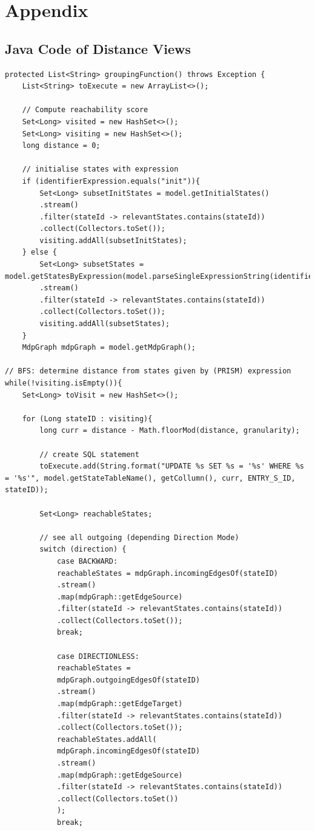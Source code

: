 \documentclass[preview]{standalone}
\begin{document}
\section{Appendix}
\subsection[]{Java Code of Distance Views}



\begin{lstlisting}[style=javaStyle, caption={grp Function java}]
protected List<String> groupingFunction() throws Exception {
	List<String> toExecute = new ArrayList<>();
	
	// Compute reachability score
	Set<Long> visited = new HashSet<>();
	Set<Long> visiting = new HashSet<>();
	long distance = 0;
	
	// initialise states with expression
	if (identifierExpression.equals("init")){
		Set<Long> subsetInitStates = model.getInitialStates()
		.stream()
		.filter(stateId -> relevantStates.contains(stateId))
		.collect(Collectors.toSet());
		visiting.addAll(subsetInitStates);
	} else {
		Set<Long> subsetStates = model.getStatesByExpression(model.parseSingleExpressionString(identifierExpression).toString())
		.stream()
		.filter(stateId -> relevantStates.contains(stateId))
		.collect(Collectors.toSet());
		visiting.addAll(subsetStates);
	}
	MdpGraph mdpGraph = model.getMdpGraph();

// BFS: determine distance from states given by (PRISM) expression
while(!visiting.isEmpty()){
	Set<Long> toVisit = new HashSet<>();
	
	for (Long stateID : visiting){
		long curr = distance - Math.floorMod(distance, granularity);
		
		// create SQL statement
		toExecute.add(String.format("UPDATE %s SET %s = '%s' WHERE %s = '%s'", model.getStateTableName(), getCollumn(), curr, ENTRY_S_ID, stateID));
		
		Set<Long> reachableStates;
		
		// see all outgoing (depending Direction Mode)
		switch (direction) {
			case BACKWARD:
			reachableStates = mdpGraph.incomingEdgesOf(stateID)
			.stream()
			.map(mdpGraph::getEdgeSource)
			.filter(stateId -> relevantStates.contains(stateId))
			.collect(Collectors.toSet());
			break;
						
			case DIRECTIONLESS:
			reachableStates =
			mdpGraph.outgoingEdgesOf(stateID)
			.stream()
			.map(mdpGraph::getEdgeTarget)
			.filter(stateId -> relevantStates.contains(stateId))
			.collect(Collectors.toSet());
			reachableStates.addAll(
			mdpGraph.incomingEdgesOf(stateID)
			.stream()
			.map(mdpGraph::getEdgeSource)
			.filter(stateId -> relevantStates.contains(stateId))
			.collect(Collectors.toSet())
			);
			break;
			

\end{lstlisting}
\end{document}
